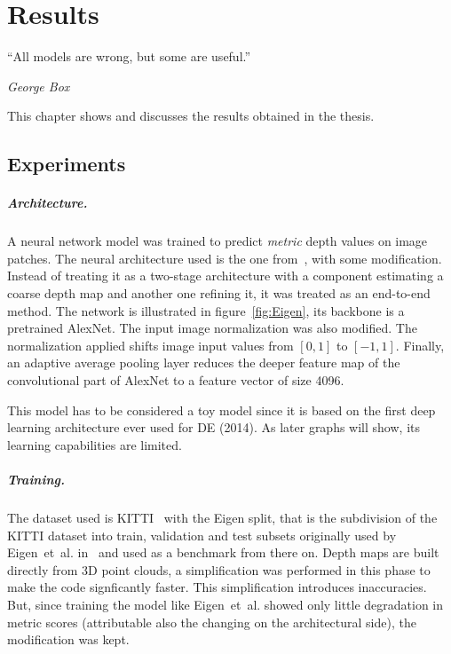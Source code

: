 \chapter{Results}
\label{chap:results}

\epigraph{\enquote{All models are wrong, but some are useful.}}{\emph{George Box}}

This chapter shows and discusses the results obtained in the thesis.

\section{Experiments}
\label{sec:experiments}

\paragraph{Architecture.}
A neural network model was trained to predict \textit{metric} depth values on image patches.
The neural architecture used is the one from~\cite{Eigen}, with some modification.
Instead of treating it as a two-stage architecture with a component estimating a coarse depth map and another one refining it, it was treated as an end-to-end method.
The network is illustrated in figure~\ref{fig:Eigen}, its backbone is a pretrained AlexNet.
The input image normalization was also modified.
The normalization applied shifts image input values from $[0, 1]$ to $[-1, 1]$.
Finally, an adaptive average pooling layer reduces the deeper feature map of the convolutional part of AlexNet to a feature vector of size 4096.

This model has to be considered a toy model since it is based on the first deep learning architecture ever used for DE (2014).
As later graphs will show, its learning capabilities are limited.

\paragraph{Training.}
The dataset used is KITTI~\cite{KITTI} with the Eigen split, that is the subdivision of the KITTI dataset into train, validation and test subsets originally used by Eigen~et~al. in~\cite{Eigen} and used as a benchmark from there on.
Depth maps are built directly from 3D point clouds, a simplification was performed in this phase to make the code signficantly faster.
This simplification introduces inaccuracies.
But, since training the model like Eigen~et~al. showed only little degradation in metric scores (attributable also the changing on the architectural side), the modification was kept.

